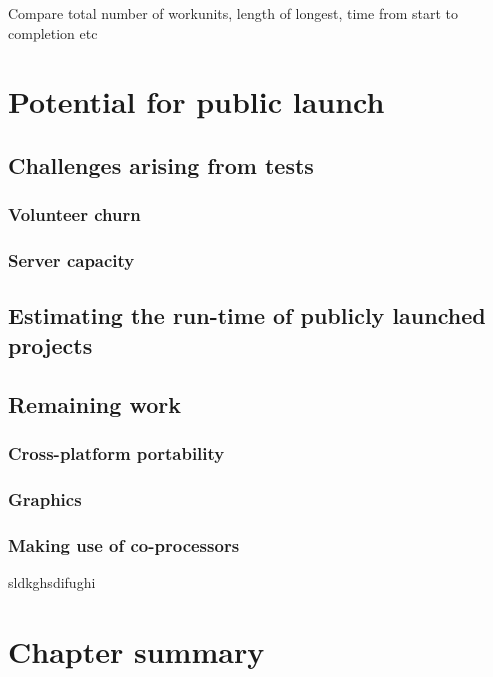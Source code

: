 Compare total number of workunits, length of longest, time from start to completion etc

\section{Potential for public launch}
\subsection{Challenges arising from tests}
\subsubsection{Volunteer churn}
\subsubsection{Server capacity}
\subsection{Estimating the run-time of publicly launched projects}
\subsection{Remaining work}
\subsubsection{Cross-platform portability}
\subsubsection{Graphics}
\subsubsection{Making use of co-processors}
sldkghsdifughi
\section{Chapter summary}
